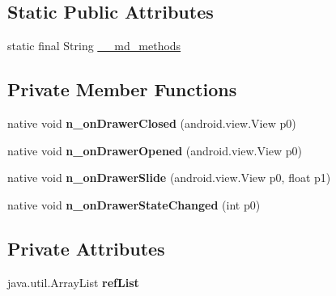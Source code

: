 \subsection*{Static Public Attributes}
\begin{DoxyCompactItemize}
\item 
static final String \hyperlink{classmd5270abb39e60627f0f200893b490a1ade_1_1NavigationPageRenderer__DrawerMultiplexedListener_afbd57ba6663a7c518799ec5668b08d40}{\+\_\+\+\_\+md\+\_\+methods}
\end{DoxyCompactItemize}
\subsection*{Private Member Functions}
\begin{DoxyCompactItemize}
\item 
\mbox{\label{classmd5270abb39e60627f0f200893b490a1ade_1_1NavigationPageRenderer__DrawerMultiplexedListener_a8d093d39d461e62b0a6ae6193975efd2}} 
native void {\bfseries n\+\_\+on\+Drawer\+Closed} (android.\+view.\+View p0)
\item 
\mbox{\label{classmd5270abb39e60627f0f200893b490a1ade_1_1NavigationPageRenderer__DrawerMultiplexedListener_aba83be49c7eae728eb6aa07ae6d151b1}} 
native void {\bfseries n\+\_\+on\+Drawer\+Opened} (android.\+view.\+View p0)
\item 
\mbox{\label{classmd5270abb39e60627f0f200893b490a1ade_1_1NavigationPageRenderer__DrawerMultiplexedListener_a833ecd6b482341746f5d469f9f080a8d}} 
native void {\bfseries n\+\_\+on\+Drawer\+Slide} (android.\+view.\+View p0, float p1)
\item 
\mbox{\label{classmd5270abb39e60627f0f200893b490a1ade_1_1NavigationPageRenderer__DrawerMultiplexedListener_a40394df52dc0b52b8560926e06cdc137}} 
native void {\bfseries n\+\_\+on\+Drawer\+State\+Changed} (int p0)
\end{DoxyCompactItemize}
\subsection*{Private Attributes}
\begin{DoxyCompactItemize}
\item 
\mbox{\label{classmd5270abb39e60627f0f200893b490a1ade_1_1NavigationPageRenderer__DrawerMultiplexedListener_a8022e4f9043b76f8c63dff3406a8d039}} 
java.\+util.\+Array\+List {\bfseries ref\+List}
\end{DoxyCompactItemize}


